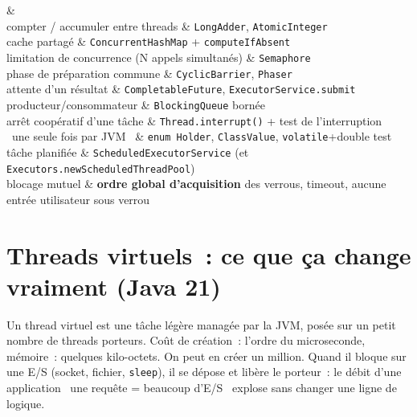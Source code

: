 \begin{tablez}[p{0.32\textwidth}X]
  \headrow {} \&  \\
  \midrule
  compter / accumuler entre threads \& \verb|LongAdder|, \verb|AtomicInteger| \\
  cache partag\'e \& \verb|ConcurrentHashMap| + \verb|computeIfAbsent| \\
  limitation de concurrence (N appels simultan\'es) \& \verb|Semaphore| \\
  phase de pr\'eparation commune \& \verb|CyclicBarrier|, \verb|Phaser| \\
  attente d'un r\'esultat \& \verb|CompletableFuture|, \verb|ExecutorService.submit| \\
  producteur/consommateur \& \verb|BlockingQueue| born\'ee \\
  arr\^et coop\'eratif d'une t\^ache \& \verb|Thread.interrupt()| + test de l'interruption \\
  \og ~une seule fois par JVM~ \fg{} \& \verb|enum Holder|, \verb|ClassValue|, \verb|volatile|+double test \\
  t\^ache planifi\'ee \& \verb|ScheduledExecutorService| (et \verb|Executors.newScheduledThreadPool|) \\
  blocage mutuel \& \textbf{ordre global d'acquisition} des verrous, timeout, aucune entr\'ee utilisateur sous verrou \\
\end{tablez}

\section{Threads virtuels~: ce que \c{c}a change vraiment (Java 21)}

Un thread virtuel est une t\^ache l\'eg\`ere manag\'ee par la JVM, pos\'ee sur un petit nombre de threads
porteurs. Co\^ut de cr\'eation~: l'ordre du microseconde, m\'emoire~: quelques kilo-octets. On peut en
cr\'eer un million. Quand il bloque sur une E/S (socket, fichier, \verb|sleep|), il se d\'epose et
lib\`ere le porteur~: le d\'ebit d'une application \og ~une requ\^ete = beaucoup d'E/S~ \fg{} explose sans
changer une ligne de logique.

